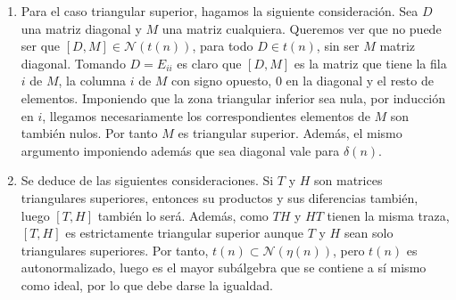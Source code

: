 \documentclass[twoside]{article}
\begin{document}
\begin{solucion}
\begin{enumerate}
\item 
Para el caso triangular superior, hagamos la siguiente consideración. Sea $D$ una matriz diagonal y $M$ una matriz cualquiera. Queremos ver que no puede ser que $[D,M] \in \mathcal{N}(t(n))$, para todo $D\in t(n)$, sin ser $M$ matriz diagonal. Tomando $D=E_{ii}$ es claro que $[D,M]$ es la matriz que tiene la fila $i$ de $M$, la columna $i$ de $M$ con signo opuesto, $0$ en la diagonal y el resto de elementos. Imponiendo que la zona triangular inferior sea nula, por inducción en $i$, llegamos  necesariamente los correspondientes elementos de $M$ son también nulos. Por tanto $M$ es triangular superior. Además, el mismo argumento imponiendo además que sea diagonal vale para $\delta(n)$.

\item Se deduce de las siguientes consideraciones. Si $T$ y $H$ son matrices triangulares superiores, entonces su productos y sus diferencias también, luego $[T,H]$ también lo será. Además, como $TH$ y $HT$ tienen la misma traza, $[T,H]$ es estrictamente triangular superior aunque $T$ y $H$ sean solo triangulares superiores. Por tanto, $t(n) \subset \mathcal{N}(\eta(n))$, pero $t(n)$ es autonormalizado, luego es el mayor subálgebra que se contiene a sí mismo como ideal, por lo que debe darse la igualdad. 
\end{enumerate}
\end{solucion}
\end{document}
